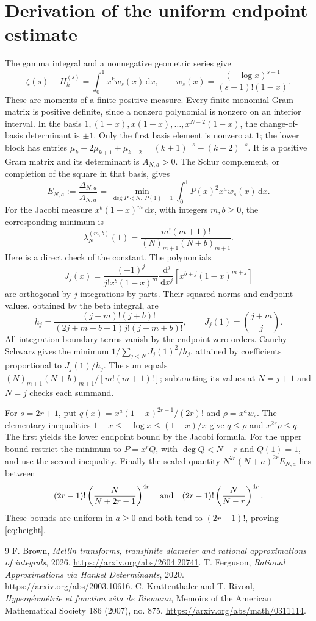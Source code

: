 \documentclass[11pt]{article}
\newcommand{\dd}{\,\mathrm{d}}
\newcommand{\HH}[2]{H_{#1}^{(#2)}}
\begin{document}
\appendix
\section{Derivation of the uniform endpoint estimate}
\label{app:endpoint}
The gamma integral and a nonnegative geometric series give
\[
 \zeta(s)-\HH{k}{s}=\int_0^1 x^k w_s(x)\dd x,
 \qquad w_s(x)=\frac{(-\log x)^{s-1}}{(s-1)!(1-x)}.
\]
These are moments of a finite positive measure. Every finite monomial
Gram matrix is positive definite, since a nonzero polynomial is nonzero
on an interior interval. In the basis
$1,(1-x),x(1-x),\ldots,x^{N-2}(1-x)$, the change-of-basis determinant
is $\pm1$. Only the first basis element is nonzero at $1$; the lower
block has entries
$\mu_k-2\mu_{k+1}+\mu_{k+2}=(k+1)^{-s}-(k+2)^{-s}$.
It is a positive Gram matrix and its determinant is $A_{N,a}>0$.
The Schur complement, or completion of the square in that basis, gives
\[
 E_{N,a}:=\frac{\Delta_{N,a}}{A_{N,a}}
 =\min_{\deg P<N,\ P(1)=1}\int_0^1P(x)^2x^aw_s(x)\dd x.
\]
For the Jacobi measure $x^b(1-x)^m\dd x$, with integers $m,b\ge0$,
the corresponding minimum is
\[
 \lambda_N^{(m,b)}(1)=\frac{m!(m+1)!}{(N)_{m+1}(N+b)_{m+1}}.
\]
Here is a direct check of the constant. The polynomials
\[
 J_j(x)=\frac{(-1)^j}{j!x^b(1-x)^m}
 \frac{\dd^j}{\dd x^j}[x^{b+j}(1-x)^{m+j}]
\]
are orthogonal by $j$ integrations by parts. Their squared norms and
endpoint values, obtained by the beta integral, are
\[
 h_j=\frac{(j+m)!(j+b)!}{(2j+m+b+1)j!(j+m+b)!},\qquad
 J_j(1)=\binom{j+m}{j}.
\]
All integration boundary terms vanish by the endpoint zero orders.
Cauchy--Schwarz gives the minimum
$1/\sum_{j<N}J_j(1)^2/h_j$, attained by coefficients proportional to
$J_j(1)/h_j$. The sum equals
$(N)_{m+1}(N+b)_{m+1}/[m!(m+1)!]$; subtracting its values at
$N=j+1$ and $N=j$ checks each summand.

For $s=2r+1$, put $q(x)=x^a(1-x)^{2r-1}/(2r)!$ and
$\rho=x^aw_s$. The elementary inequalities
$1-x\le-\log x\le(1-x)/x$ give $q\le\rho$ and
$x^{2r}\rho\le q$. The first yields the lower endpoint bound by
the Jacobi formula. For the upper bound restrict the minimum to
$P=x^rQ$, with $\deg Q<N-r$ and $Q(1)=1$, and use the second inequality.
Finally the scaled quantity $N^{2r}(N+a)^{2r}E_{N,a}$ lies between
\[
 (2r-1)!\left(\frac N{N+2r-1}\right)^{4r}
 \quad\hbox{and}\quad
 (2r-1)!\left(\frac N{N-r}\right)^{4r}.
\]
These bounds are uniform in $a\ge0$ and both tend to $(2r-1)!$,
proving \eqref{eq:height}.

\begin{thebibliography}{9}
\small
{}
F. Brown, \emph{Mellin transforms, transfinite diameter and rational
approximations of integrals}, 2026.
\url{https://arxiv.org/abs/2604.20741}.
T. Ferguson, \emph{Rational Approximations via Hankel Determinants}, 2020.
\url{https://arxiv.org/abs/2003.10616}.
C. Krattenthaler and T. Rivoal,
\emph{Hyperg\'eom\'etrie et fonction z\^eta de Riemann},
Memoirs of the American Mathematical Society 186 (2007), no. 875.
\url{https://arxiv.org/abs/math/0311114}.
\end{thebibliography}
\end{document}
